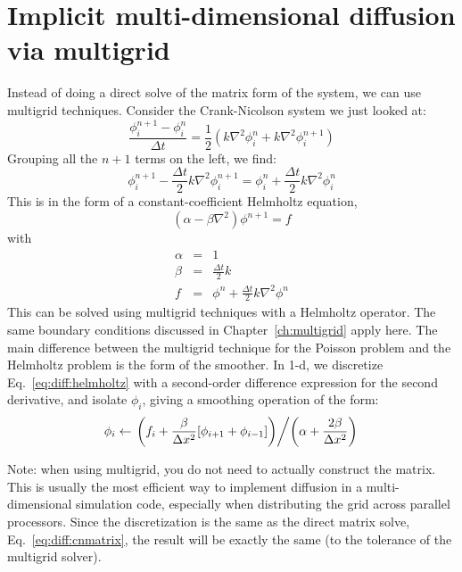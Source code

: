 \section{Implicit multi-dimensional diffusion via multigrid}
\label{diff:sec:implicit_mg}

Instead of doing a direct solve of the matrix form of the system, we 
can use multigrid techniques.  Consider the Crank-Nicolson system we just 
looked at:
\begin{equation}
\frac{\phi^{n+1}_i - \phi^n_i}{\Delta t} = 
   \frac{1}{2} \left ( k \nabla^2 \phi^n_i + k \nabla^2 \phi^{n+1}_i \right )
\end{equation}
Grouping all the 
$n+1$ terms on the left, we find:
\begin{equation}
\phi^{n+1}_i - \frac{\Delta t}{2} k \nabla^2 \phi^{n+1}_i = 
    \phi^n_i + \frac{\Delta t}{2} k \nabla^2 \phi^n_i
\end{equation}
This is in the form of a constant-coefficient Helmholtz equation,
\begin{equation}
\label{eq:diff:helmholtz}
(\alpha - \beta \nabla^2) \phi^{n+1} = f
\end{equation}
with
\begin{eqnarray}
\alpha &=& 1 \\
\beta &=& \frac{\Delta t}{2} k \\
f &=& \phi^n + \frac{\Delta t}{2} k \nabla^2 \phi^n
\end{eqnarray}
This can be solved using multigrid techniques with a Helmholtz
operator.  The same boundary conditions discussed in
Chapter~\ref{ch:multigrid} apply here.  The main difference between
the multigrid technique for the Poisson problem and the Helmholtz
problem is the form of the smoother.  In 1-d, we discretize
Eq.~\ref{eq:diff:helmholtz} with a second-order difference expression
for the second derivative, and isolate $\phi_i$, giving a smoothing
operation of the form:
\begin{equation}
\phi_{i} \leftarrow
 \left .    \left ( f_{i} + \frac{\beta}{\Delta x^2} [\phi_{i+1}
                             + \phi_{i-1}] \right ) \middle / 
\left ( \alpha + \frac{2 \beta}{\Delta x^2}  \right )  \right .
\end{equation}

Note: when using multigrid, you do not need to actually construct the
matrix.  This is usually the most efficient way to implement diffusion
in a multi-dimensional simulation code, especially when distributing
the grid across parallel processors.  Since the discretization is the
same as the direct matrix solve, Eq.~\ref{eq:diff:cnmatrix}, the
result will be exactly the same (to the tolerance of the multigrid
solver).


